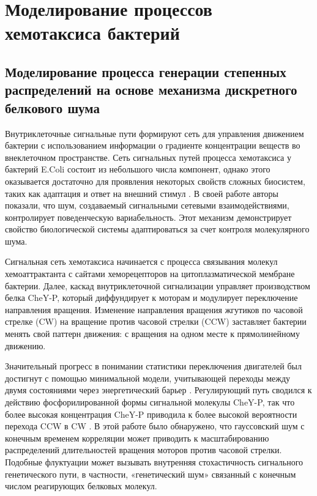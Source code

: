 \chapter{Моделирование процессов хемотаксиса бактерий}\label{ch:ch2}

\section{Моделирование процесса генерации степенных распределений на основе механизма дискретного белкового шума}\label{sec:ch2/sec1}
Внутриклеточные сигнальные пути формируют сеть для управления движением бактерии с использованием информации о градиенте концентрации веществ во внеклеточном пространстве. Сеть сигнальных путей процесса хемотаксиса у бактерий E.Coli состоит из небольшого числа компонент, однако этого оказывается достаточно для проявления некоторых свойств сложных биосистем, таких как адаптация и ответ на внешний стимул \cite{korobkova_molecular_2004}. В своей работе авторы показали, что шум, создаваемый сигнальными сетевыми взаимодействиями, контролирует поведенческую вариабельность. Этот механизм демонстрирует свойство биологической системы адаптироваться за счет контроля молекулярного шума. 

Сигнальная сеть хемотаксиса начинается с процесса связывания молекул хемоаттрактанта с сайтами хеморецепторов на цитоплазматической мембране бактерии. Далее, каскад внутриклеточной сигнализации управляет производством белка CheY-P, который диффундирует к моторам и модулирует переключение направления вращения. Изменение направления вращения жгутиков по часовой стрелке (CW) на вращение против часовой стрелки (CCW) заставляет бактерии менять свой паттерн движения: с вращения на одном месте к прямолинейному движению.

Значительный прогресс в понимании статистики переключения двигателей был достигнут с помощью минимальной модели, учитывающей переходы между двумя состояниями через энергетический барьер \cite{tu_how_2005}. Регулирующий путь сводился к действию фосфорилированной формы сигнальной молекулы CheY-P, так что более высокая концентрация CheY-P приводила к более высокой вероятности перехода CCW в CW \cite{khan_steady-state_1980}. В этой работе было обнаружено, что гауссовский шум с конечным временем корреляции может приводить к масштабированию распределений длительностей вращения моторов против часовой стрелки. Подобные флуктуации может вызывать внутренняя стохастичность сигнального генетического пути, в частности, «генетический шум» связанный с конечным числом реагирующих белковых молекул.

